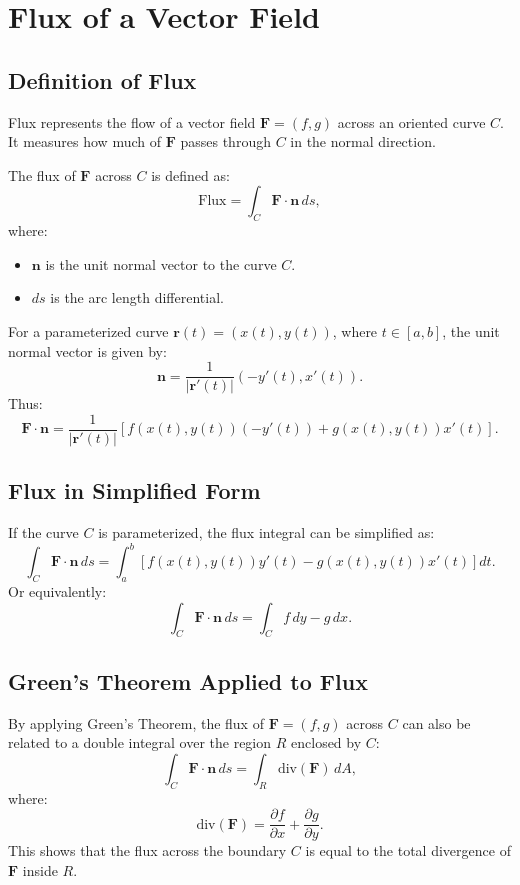\documentclass{report}
\begin{document}
\section{Flux of a Vector Field}

\subsection*{Definition of Flux}
Flux represents the flow of a vector field \( \mathbf{F} = (f, g) \) across an oriented curve \( C \). It measures how much of \( \mathbf{F} \) passes through \( C \) in the normal direction.

The flux of \( \mathbf{F} \) across \( C \) is defined as:
\[
\text{Flux} = \int_C \mathbf{F} \cdot \mathbf{n} \, ds,
\]
where:
\begin{itemize}
    \item \( \mathbf{n} \) is the unit normal vector to the curve \( C \).
    \item \( ds \) is the arc length differential.
\end{itemize}

For a parameterized curve \( \mathbf{r}(t) = (x(t), y(t)) \), where \( t \in [a, b] \), the unit normal vector is given by:
\[
\mathbf{n} = \frac{1}{|\mathbf{r}'(t)|} (-y'(t), x'(t)).
\]
Thus:
\[
\mathbf{F} \cdot \mathbf{n} = \frac{1}{|\mathbf{r}'(t)|} \left[f(x(t), y(t)) (-y'(t)) + g(x(t), y(t)) x'(t)\right].
\]



\subsection*{Flux in Simplified Form}
If the curve \( C \) is parameterized, the flux integral can be simplified as:
\[
\int_C \mathbf{F} \cdot \mathbf{n} \, ds = \int_a^b \left[f(x(t), y(t)) y'(t) - g(x(t), y(t)) x'(t)\right] dt.
\]
Or equivalently:
\[
\int_C \mathbf{F} \cdot \mathbf{n} \, ds = \int_C f \, dy - g \, dx.
\]



\subsection*{Green's Theorem Applied to Flux}
By applying Green's Theorem, the flux of \( \mathbf{F} = (f, g) \) across \( C \) can also be related to a double integral over the region \( R \) enclosed by \( C \):
\[
\int_C \mathbf{F} \cdot \mathbf{n} \, ds = \int_R \text{div}(\mathbf{F}) \, dA,
\]
where:
\[
\text{div}(\mathbf{F}) = \frac{\partial f}{\partial x} + \frac{\partial g}{\partial y}.
\]
This shows that the flux across the boundary \( C \) is equal to the total divergence of \( \mathbf{F} \) inside \( R \).
\end{document}
